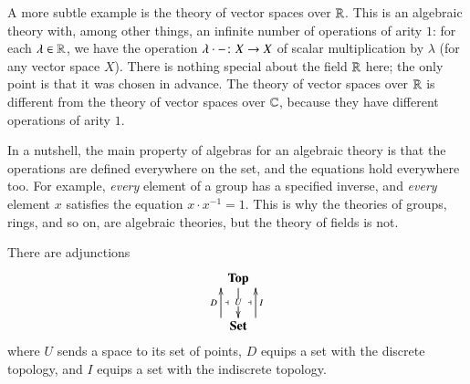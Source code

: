 \begin{remark}
A more subtle example is the theory of vector spaces over $\mathbb{R}$.  This is
an algebraic theory with, among other things, an infinite number of
operations of arity $1$: for each $\lambda \in \mathbb{R}$, we have the
operation $\lambda \cdot \dashbk\from X \to X$ of scalar multiplication by
$\lambda$ (for any vector space $X$).  There is nothing special about the
field $\mathbb{R}$ here; the only point is that it was chosen in advance.  The
theory of vector spaces over $\mathbb{R}$ is different from the theory of
vector spaces over $\mathbb{C}$, because they have different operations of
arity $1$.

In a nutshell, the main property of algebras for an algebraic theory is
that the operations are defined everywhere on the set, and the equations
hold everywhere too.  For example, \emph{every} element of a group has a
specified inverse, and \emph{every} element $x$ satisfies the equation $x
\cdot x^{-1} = 1$.  This is why the theories of groups, rings, and so on,
are algebraic theories, but the theory of fields is not.
\end{remark}

\begin{example}
\label{eg:adjn:spaces}
There are adjunctions
\[
\xymatrix{
\Tp \ar[d]|{U\vphantom{gl'}}	\\
\Set \ar@<3ex>[u]^D_\ladj \ar@<-3ex>[u]_I^\ladj
}
\]
where $U$ sends a space to its set of points, $D$ equips a set with the
discrete%
%
%
topology, and $I$ equips a set with the indiscrete%
%
%
%
topology.
\end{example}

